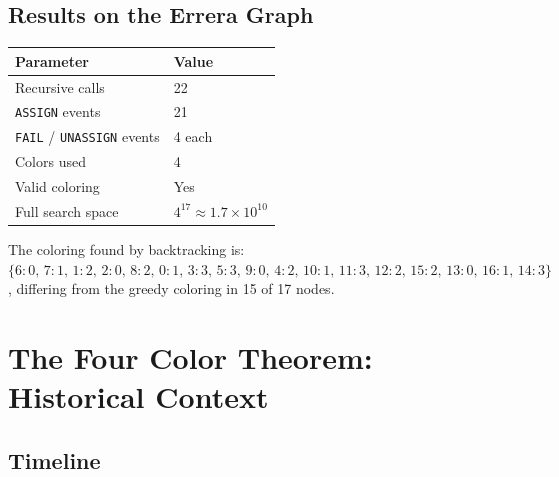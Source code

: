 \documentclass[12pt,letterpaper]{article}
\theoremstyle{plain}
\theoremstyle{definition}
\theoremstyle{remark}
\begin{document}
\subsection{Results on the Errera Graph}

\begin{center}
\begin{tabular}{ll}
\toprule
\textbf{Parameter} & \textbf{Value} \\
\midrule
Recursive calls       & 22 \\
\texttt{ASSIGN} events & 21 \\
\texttt{FAIL} / \texttt{UNASSIGN} events & 4 each \\
Colors used           & 4 \\
Valid coloring         & Yes \\
Full search space     & $4^{17} \approx 1.7 \times 10^{10}$ \\
\bottomrule
\end{tabular}
\end{center}

The coloring found by backtracking is:
$\{6{:}0,\, 7{:}1,\, 1{:}2,\, 2{:}0,\, 8{:}2,\, 0{:}1,\, 3{:}3,\, 5{:}3,\,
9{:}0,\, 4{:}2,\, 10{:}1,\, 11{:}3,\, 12{:}2,\, 15{:}2,\, 13{:}0,\, 16{:}1,\,
14{:}3\}$, differing from the greedy coloring in 15 of 17 nodes.

\section{The Four Color Theorem: Historical Context}
\label{sec:history}

\subsection{Timeline}
\end{document}
